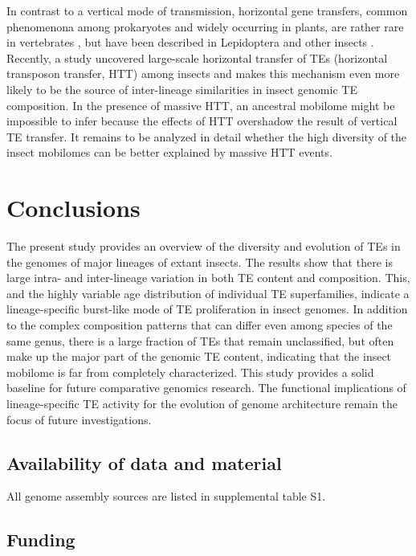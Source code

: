 In contrast to a vertical mode of transmission, horizontal gene
transfers, common phenomenona among prokaryotes and widely occurring in
plants, are rather rare in vertebrates \citep{Syvanen2012,Wallau2012},
but have been described in Lepidoptera \citep{Sormacheva2012} and other
insects \citep{Nakabachi2015}. Recently, a study uncovered large-scale
horizontal transfer of TEs (horizontal transposon transfer, HTT) among
insects \citep{Peccoud2017} and makes this mechanism even more likely to
be the source of inter-lineage similarities in insect genomic TE
composition.  In the presence of massive HTT, an ancestral mobilome
might be impossible to infer because the effects of HTT overshadow the
result of vertical TE transfer. It remains to be analyzed in detail
whether the high diversity of the insect mobilomes can be better
explained by massive HTT events.

\section{Conclusions}\label{conclusions}

The present study provides an overview of the diversity and evolution of
TEs in the genomes of major lineages of extant insects.  The results
show that there is large intra- and inter-lineage variation in both TE
content and composition.  This, and the highly variable age distribution
of individual TE superfamilies, indicate a lineage-specific burst-like
mode of TE proliferation in insect genomes.  In addition to the complex
composition patterns that can differ even among species of the same
genus, there is a large fraction of TEs that remain unclassified, but
often make up the major part of the genomic TE content, indicating that
the insect mobilome is far from completely characterized.  This study
provides a solid baseline for future comparative genomics research.  The
functional implications of lineage-specific TE activity for the
evolution of genome architecture remain the focus of future
investigations.


\subsection{Availability of data and
material}\label{availability-of-data-and-material}

All genome assembly sources are listed in supplemental table S1.

\subsection{Funding}\label{funding}


